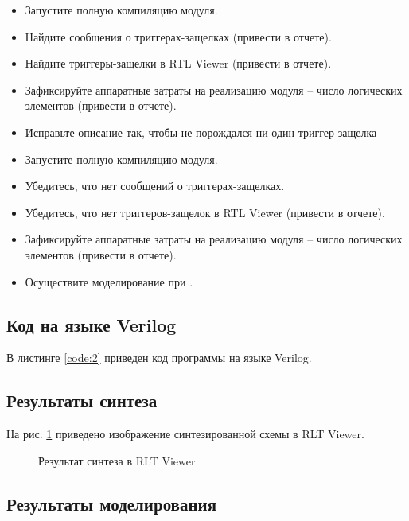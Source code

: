 \begin{itemize}
	\item Запустите полную компиляцию модуля.
	\item Найдите сообщения о триггерах-защелках (привести в отчете).
	\item Найдите триггеры-защелки в RTL Viewer (привести в отчете).
	\item Зафиксируйте аппаратные затраты на реализацию модуля -- число логических элементов (привести в отчете).
	\item Исправьте описание так, чтобы не порождался ни один триггер-защелка
	\item Запустите полную компиляцию модуля.
	\item Убедитесь, что нет сообщений о триггерах-защелках.
	\item Убедитесь, что нет триггеров-защелок в RTL Viewer (привести в отчете).
	\item Зафиксируйте аппаратные затраты на реализацию модуля -- число логических элементов (привести в отчете).
	\item Осуществите моделирование при .
\end{itemize}

\subsection{Код на языке Verilog}

В листинге \ref{code:2} приведен код программы на языке Verilog.

%

\subsection{Результаты синтеза}

На рис. \ref{fig:lab7_2_rtl} приведено изображение синтезированной схемы в RLT Viewer.

\begin{figure}[H]
\begin{center}
	\caption{Результат синтеза в RLT Viewer}
	\label{fig:lab7_2_rtl}
\end{center}
\end{figure}

\subsection{Результаты моделирования}
\label{sec:lab7_2_modeling}

